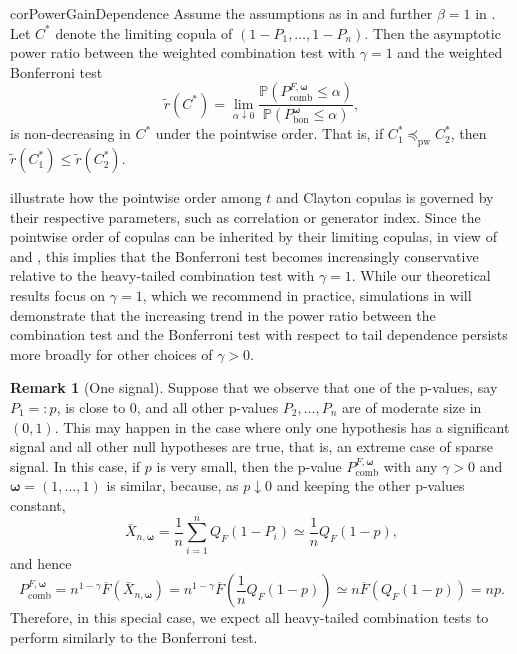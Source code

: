 \documentclass[12pt]{article}
\theoremstyle{plain}
\theoremstyle{plain}
\theoremstyle{definition}
\newtheorem{rem}{Remark}[section]
\renewcommand{\Pr}{\mathbb{P}}
\begin{document}
\begin{restatable}{cor}{PowerGainDependence}
\label{thm:bonferroni-more-conservative-with-dependence-power}
Assume the assumptions as in  and further $\beta=1$ in . Let $C^*$ denote the limiting copula of $(1 - P_1, \dots, 1 - P_n)$. Then the asymptotic power ratio between the weighted combination test with $\gamma=1$ and the weighted Bonferroni test 
\begin{equation}
\label{eq:power-gain-vs-dependence}
\tilde{r}(C^*)=\lim_{\alpha\downarrow0}\frac{\Pr\left(P^{F,\bm{\omega}}_\mathrm{comb}\leq \alpha\right)}{\Pr\left(P^{\bm{\omega}}_{\mathrm{bon}}\leq \alpha\right)},
\end{equation}
is non-decreasing in $C^*$ under the pointwise order. That is, if $C_1^*\preceq_{\mathrm{pw}}C_2^*$, then $\tilde r(C_1^*)\le \tilde r(C_2^*)$.
\end{restatable}

 illustrate how the pointwise order among $t$ and Clayton copulas is governed by their respective parameters, such as correlation or generator index. Since the pointwise order of copulas can be inherited by their limiting copulas, in view of  and , this implies that the Bonferroni test becomes increasingly conservative relative to the heavy-tailed combination test with $\gamma=1$. 
While our theoretical results focus on $\gamma = 1$, which we recommend in practice, simulations in  will demonstrate that the increasing trend in the power ratio between the combination test and the Bonferroni test with respect to tail dependence persists more broadly for other choices of $\gamma > 0$. 


\begin{rem}[One signal]
\label{rem:sparse-signal}
Suppose that we observe that one of the p-values, say $P_1=:p$, is close to $0$, and all other p-values $P_2,\dots,P_n$ are of moderate size in $(0,1)$. This may happen in the case where only one hypothesis has a significant signal and all other null hypotheses are true, that is, an extreme case of sparse signal.
In this case, if $p$ is very small, then  the  p-value  $P^{F,\bm{\omega}}_\mathrm{comb}$ with any $\gamma>0$ and $\bm{\omega}=(1,\dots,1)$ is similar, because, as $p\downarrow 0$ and keeping the other p-values constant,
$$ 
 \bar X_{n,\bm{\omega}}=
\frac{1}{n}\sum_{i=1}^nQ_F (1 - P_i  ) 
\simeq \frac 1nQ_F (1 -p ) ,
$$
and hence
$$
P_{\mathrm{comb}}^{F,\bm\omega}=  n^{1-\gamma} \overline F
(\bar X_{n,\bm{\omega}})=
 n^{1-\gamma} \overline F\left(
\frac{1}{n} Q_F\left(1  -p\right)\right)
\simeq  n  \overline F (
 Q_F (1  -p ) )
=np.
$$
Therefore, in this special case, we expect all heavy-tailed combination tests to perform similarly to the Bonferroni test. 
\end{rem}
\end{document}

